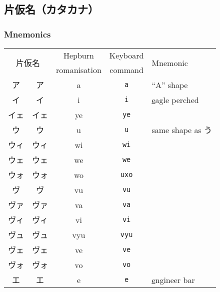 \documentclass[../nihongo-gakushuu-kyouzai.tex]{subfiles}
\begin{document}
\subsection{片仮名（カタカナ）}
\subsubsection{Mnemonics}
\begin{longtable}[c]{@{}ccccl@{}}
    \toprule
    \multicolumn{2}{c}{\multirow{2}{*}{片仮名}} & Hepburn & Keyboard & \multirow{2}{*}{Mnemonic} \\
    \multicolumn{2}{c}{} & romanisation & command & \\* \midrule
    ア & {\sffamily ア} & a & \texttt{a} & ``A'' shape \\
    イ & {\sffamily イ} & i & \texttt{i} & \ul{e}agle perched \\
    \color{blue} イェ & \color{blue} {\sffamily イェ} & \color{blue} ye & \color{blue} \texttt{ye} & \\
    ウ & {\sffamily ウ} & u & \texttt{u} & same shape as う \\
    \color{blue} ウィ & \color{blue} {\sffamily ウィ} & \color{blue} wi & \color{blue} \texttt{wi} & \\
    \color{blue} ウェ & \color{blue} {\sffamily ウェ} & \color{blue} we & \color{blue} \texttt{we} & \\
    \color{blue} ウォ & \color{blue} {\sffamily ウォ} & \color{blue} wo & \color{red} \texttt{uxo} & \\
    \color{blue} ヴ & \color{blue} {\sffamily ヴ} & \color{blue} vu & \color{blue} \texttt{vu} & \\
    \color{blue} ヴァ & \color{blue} {\sffamily ヴァ} & \color{blue} va & \color{blue} \texttt{va} & \\
    \color{blue} ヴィ & \color{blue} {\sffamily ヴィ} & \color{blue} vi & \color{blue} \texttt{vi} & \\
    \color{blue} ヴュ & \color{blue} {\sffamily ヴュ} & \color{blue} vyu & \color{blue} \texttt{vyu} & \\
    \color{blue} ヴェ & \color{blue} {\sffamily ヴェ} & \color{blue} ve & \color{blue} \texttt{ve} & \\
    \color{blue} ヴォ & \color{blue} {\sffamily ヴォ} & \color{blue} vo & \color{blue} \texttt{vo} & \\
    エ & {\sffamily エ} & e & \texttt{e} & \ul{e}ngineer bar \\

\end{longtable}
\end{document}
